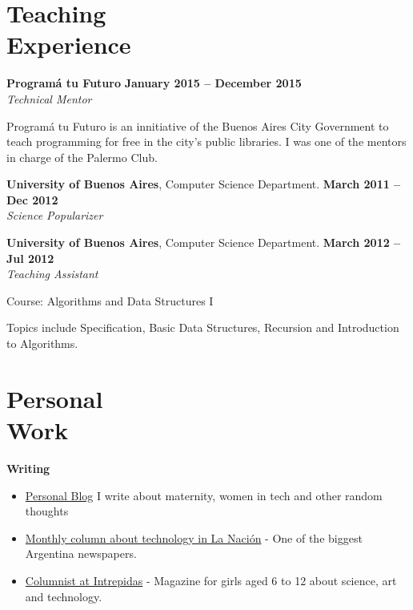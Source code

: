 \documentclass[margin,line]{resume}
\begin{document}
\begin{resume}
\section{\mysidestyle Teaching\\Experience}

\textbf{Program\'a tu Futuro} \hfill \textbf{January 2015 --  December 2015}
\\
\textsl{Technical Mentor} \hfill 
\begin{list2}
	\item Program\'a tu Futuro is an innitiative of the Buenos Aires City Government to teach programming for free in the city's public libraries. I was one of the mentors in charge of the Palermo Club.
\end{list2}\vspace{-1.5mm}

\textbf{University of Buenos Aires}, Computer Science Department. \hfill \textbf{March 2011 --  Dec 2012}
\\
\textsl{Science Popularizer} \hfill 

\textbf{University of Buenos Aires}, Computer Science Department. \hfill \textbf{March 2012 --  Jul 2012}
\\
\textsl{Teaching Assistant} \hfill
\begin{list2}
	\item Course: Algorithms and Data Structures I
	\item Topics include Specification, Basic Data Structures, Recursion and Introduction to Algorithms.
\end{list2}\vspace{-1.5mm}

\vspace{2mm}



\section{\mysidestyle Personal\\Work}


\textbf{Writing}
\begin{itemize}
\item \href{https://medium.com/@carohadad} {Personal Blog}  I write about maternity, women in tech and other random thoughts
\item \href{http://www.lanacion.com.ar/autor/carolina-hadad-10522} {Monthly column about technology in La Naci\'on} - One of the biggest Argentina newspapers.
\item \href{https://www.intrepidas.com.ar/} {Columnist at Intrepidas} - Magazine for girls aged 6 to 12 about science, art and technology.
\end{itemize}





\end{resume}
\end{document}
